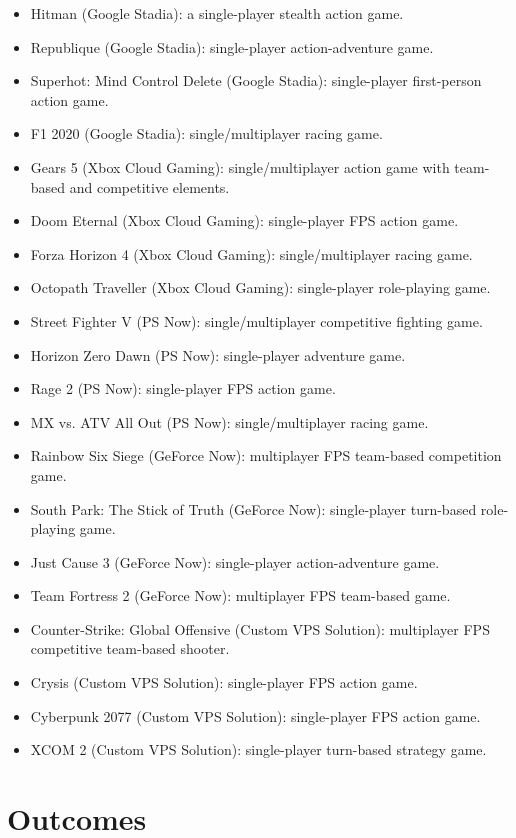 \documentclass[titlepage, 12pt]{article}
\begin{document}
	\begin{itemize}
	\item {Hitman (Google Stadia): a single-player stealth action game.}
	\item {Republique (Google Stadia): single-player action-adventure game.}
	\item {Superhot: Mind Control Delete (Google Stadia): single-player first-person action game.}
	\item {F1 2020 (Google Stadia): single/multiplayer racing game.}
	\item {Gears 5 (Xbox Cloud Gaming): single/multiplayer action game with team-based and competitive elements.}
	\item {Doom Eternal (Xbox Cloud Gaming): single-player FPS action game.}
	\item {Forza Horizon 4 (Xbox Cloud Gaming): single/multiplayer racing game.}
	\item {Octopath Traveller (Xbox Cloud Gaming): single-player role-playing game.}
	\item {Street Fighter V (PS Now): single/multiplayer competitive fighting game.}
	\item {Horizon Zero Dawn (PS Now): single-player adventure game.}
	\item {Rage 2 (PS Now): single-player FPS action game.}
	\item {MX vs. ATV All Out (PS Now): single/multiplayer racing game.}
	\item {Rainbow Six Siege (GeForce Now): multiplayer FPS team-based competition game.}
	\item {South Park: The Stick of Truth (GeForce Now): single-player turn-based role-playing game.}
	\item {Just Cause 3 (GeForce Now): single-player action-adventure game.}
	\item {Team Fortress 2 (GeForce Now): multiplayer FPS team-based game.}
	\item {Counter-Strike: Global Offensive (Custom VPS Solution): multiplayer FPS competitive team-based shooter.}
	\item {Crysis (Custom VPS Solution): single-player FPS action game.}
	\item {Cyberpunk 2077 (Custom VPS Solution): single-player FPS action game.}
	\item {XCOM 2 (Custom VPS Solution): single-player turn-based strategy game.}
	\end{itemize}

\section{Outcomes}
\end{document}
